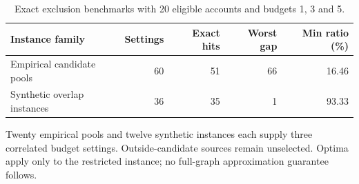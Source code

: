 \begin{table}[t]
\centering
\footnotesize
\caption{Exact exclusion benchmarks with 20 eligible accounts and budgets 1, 3 and 5.}
\label{tab:revision_exact}
\begin{tabular}{lrrrr}
\toprule
Instance family & Settings & Exact hits & Worst gap & Min ratio (\%)\\
\midrule
Empirical candidate pools & 60 & 51 & 66 & 16.46\\
Synthetic overlap instances & 36 & 35 & 1 & 93.33\\
\bottomrule
\end{tabular}
\par\smallskip\begin{minipage}{0.98\textwidth}\footnotesize Twenty empirical pools and twelve synthetic instances each supply three correlated budget settings. Outside-candidate sources remain unselected. Optima apply only to the restricted instance; no full-graph approximation guarantee follows.\end{minipage}
\end{table}
